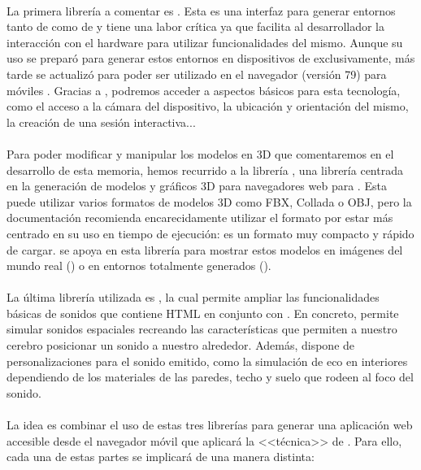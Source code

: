 \documentclass{subfiles}
\begin{document}
        \paragraph{}
        La primera librería a comentar es \webxr \cite{web:webxr}. Esta es una interfaz para generar entornos tanto de \ra como de \rv y tiene una labor crítica ya que facilita al desarrollador la interacción con el hardware para utilizar funcionalidades del mismo. Aunque su uso se preparó para generar estos entornos en dispositivos de \rv exclusivamente, más tarde se actualizó para poder ser utilizado en el navegador \googlechrome (versión 79) para móviles \android. Gracias a \webxr, podremos acceder a aspectos básicos para esta tecnología, como el acceso a la cámara del dispositivo, la ubicación y orientación del mismo, la creación de una sesión interactiva...

        \paragraph{}
        Para poder modificar y manipular los modelos en 3D que comentaremos en el desarrollo de esta memoria, hemos recurrido a la librería \threejs \cite{web:threejs}, una librería centrada en la generación de modelos y gráficos 3D para navegadores web para \js. Esta puede utilizar varios formatos de modelos 3D como FBX, Collada o OBJ, pero la documentación recomienda encarecidamente utilizar el formato \gltf por estar más centrado en su uso en tiempo de ejecución: es un formato muy compacto y rápido de cargar. \webxr se apoya en esta librería para mostrar estos modelos en imágenes del mundo real (\ra) o en entornos totalmente generados (\rv).

        \paragraph{}
        La última librería utilizada es \resonanceaudio \cite{web:resonance_audio}, la cual permite ampliar las funcionalidades básicas de sonidos que contiene HTML en conjunto con \js. En concreto, \resonanceaudio permite simular sonidos espaciales recreando las características que permiten a nuestro cerebro posicionar un sonido a nuestro alrededor. Además, dispone de personalizaciones para el sonido emitido, como la simulación de eco en interiores dependiendo de los materiales de las paredes, techo y suelo que rodeen al foco del sonido.

        \paragraph{}
        La idea es combinar el uso de estas tres librerías para generar una aplicación web accesible desde el navegador móvil \googlechrome que aplicará la <<técnica>> de \ra. Para ello, cada una de estas partes se implicará de una manera distinta:
        
\end{document}
